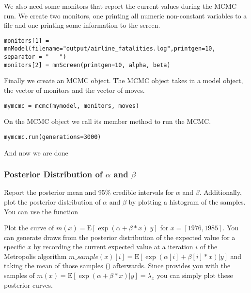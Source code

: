 We also need some monitors that report the current values during the MCMC run.
We create two monitors, one printing all numeric non-constant variables to a file and one printing some information to the screen.
{\tt \begin{snugshade*}
\begin{lstlisting} 
monitors[1] = mnModel(filename="output/airline_fatalities.log",printgen=10, separator = "	")
monitors[2] = mnScreen(printgen=10, alpha, beta)
\end{lstlisting}
\end{snugshade*}}
Finally we create an MCMC object.
The MCMC object takes in a model object, the vector of monitors and the vector of moves.
{\tt \begin{snugshade*}
\begin{lstlisting} 
mymcmc = mcmc(mymodel, monitors, moves)
\end{lstlisting}
\end{snugshade*}}
On the MCMC object we call its member method  to run the MCMC.
{\tt \begin{snugshade*}
\begin{lstlisting} 
mymcmc.run(generations=3000)
\end{lstlisting}
\end{snugshade*}}
And now we are done {\LARGE \smiley}


\subsubsection{Posterior Distribution of $\alpha$ and $\beta$}
 
Report the posterior mean and 95\% credible intervals for $\alpha$ and $\beta$. 
Additionally, plot the posterior distribution of $\alpha$ and $\beta$ by plotting a histogram of the samples. 
You can use the \R function

Plot the curve of $m(x) = \text{E}[\exp(\alpha+\beta*x)|y]$ for $x = [1976,1985]$. 
You can generate draws from the posterior distribution of the expected value for a specific $x$ by recording the current expected value at a iteration $i$ of the Metropolis algorithm $m\_sample(x)[i] = \text{E}[\exp(\alpha[i]+\beta[i]*x)|y]$ and taking the mean of those samples () afterwards. Since \RevBayes provides you with the samples of $m(x) = \text{E}[\exp(\alpha+\beta*x)|y] = \lambda_x$ you can simply plot these posterior curves.
 
